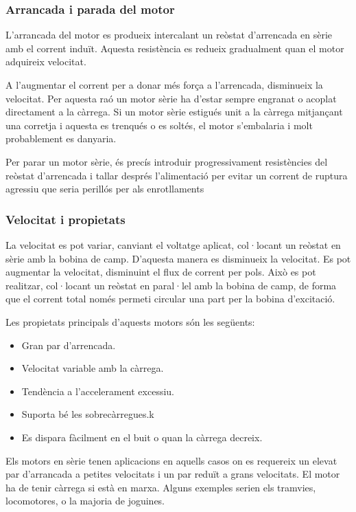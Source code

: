 \subsubsection{Arrancada i parada del motor}
L'arrancada del motor es produeix intercalant un reòstat d'arrencada en sèrie amb el corrent induït. Aquesta resistència es redueix gradualment quan el motor adquireix velocitat. 

A l'augmentar el corrent per a donar més força a l'arrencada, disminueix la velocitat. Per aquesta raó un motor sèrie ha d'estar sempre engranat o acoplat directament a la càrrega. Si un motor sèrie estigués unit a la càrrega mitjançant una corretja i aquesta es trenqués o es soltés, el motor s'embalaria i molt probablement es danyaria.

Per parar un motor sèrie, és precís introduir progressivament resistències del reòstat d'arrencada i tallar després l'alimentació per evitar un corrent de ruptura agressiu que seria perillós per als enrotllaments

\subsubsection{Velocitat i propietats}
La velocitat es pot variar, canviant el voltatge aplicat, col·locant un reòstat en sèrie amb la bobina de camp. D'aquesta manera es disminueix la velocitat. Es pot augmentar la velocitat, disminuint el flux de corrent per pols. Això es pot realitzar, col·locant un reòstat en paral·lel amb la bobina de camp, de forma que el corrent total només permeti circular una part per la bobina d'excitació.

Les propietats principals d'aquests motors són les següents:
\begin{itemize}
    \item Gran par d'arrencada.
    \item Velocitat variable amb la càrrega.
    \item Tendència a l'accelerament excessiu.
    \item Suporta bé les sobrecàrregues.k
    \item Es dispara fàcilment en el buit o quan la càrrega decreix.
\end{itemize}

Els motors en sèrie tenen aplicacions en aquells casos on es requereix un elevat par d'arrancada a petites velocitats i un par reduït a grans velocitats. El motor ha de tenir càrrega si està en marxa. Alguns exemples serien els tramvies, locomotores, o la majoria de joguines. 

